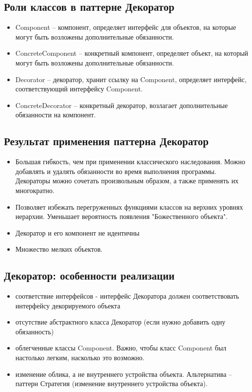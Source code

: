 \subsection{Роли классов в паттерне Декоратор}
 \begin{itemize}
    \item Component – компонент, определяет интерфейс для объектов, на которые могут быть возложены дополнительные обязанности.
    \item ConcreteComponent – конкретный компонент, определяет объект, на который могут быть возложены дополнительные обязанности.
    \item Decorator – декоратор, хранит ссылку на Component, определяет интерфейс, соответствующий интерфейсу Component.
    \item ConcreteDecorator – конкретный декоратор, возлагает дополнительные обязанности на компонент.
    \end{itemize}

\subsection{Результат применения паттерна Декоратор}
 \begin{itemize}
    \item Большая гибкость, чем при применении классического наследования. Можно добавлять и удалять обязанности во время выполнения программы. Декораторы можно сочетать произвольным образом, а также применять их многократно.
    \item Позволяет избежать перегруженных функциями классов на верхних уровнях иерархии. Уменьшает вероятность появления "Божественного объекта".
    \item Декоратор и его компонент не идентичны
    \item Множество мелких объектов.
    \end{itemize}
\subsection{Декоратор: особенности реализации}
\begin{itemize}
    \item соответствие интерфейсов - интерфейс Декоратора должен соответствовать интерфейсу декорируемого объекта
    \item отсутствие абстрактного класса Декоратор (если нужно добавить одну обязанность)
    \item облегченные классы Component. Важно, чтобы класс Component был настолько легким, насколько это возможно.
    \item изменение облика, а не внутреннего устройства объекта. Альтернатива – паттерн Стратегия (изменение внутреннего устройства объекта).
    \end{itemize}
